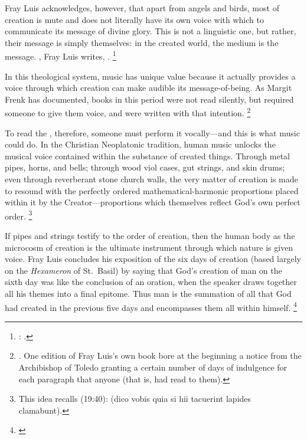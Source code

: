 Fray Luis acknowledges, however, that apart from angels and birds, most of creation is mute and does not literally have its own voice with which to communicate its message of divine glory.
This  is not a linguistic one, but rather, their message is simply themselves: in the created world, the medium is the message.
, Fray Luis writes, .%
	\footnote{%
	\Autocite[192]{LuisdeGranada:Simbolo}: .
	}

In this theological system, music has unique value because it actually provides a voice through which creation can make audible its message-of-being.
As Margit Frenk has documented, books in this period were not read silently, but required someone to give them voice, and were written with that intention.%
	\footnote{%
	\autocite{Frenk:Voz}.
One edition of Fray Luis's own book  bore at the beginning a notice from the Archibishop of Toledo granting a certain number of days of indulgence for each paragraph that anyone  (that is, had read to them).
	}

To read the , therefore, someone must perform it vocally---and this is what music could do.
In the Christian Neoplatonic tradition, human music unlocks the musical voice contained within the substance of created things.
Through metal pipes, horns, and bells; through wood viol cases, gut strings, and skin drums; even through reverberant stone church walls, the very matter of creation is made to resound with the perfectly ordered mathematical-harmonic proportions placed within it by the Creator---proportions which themselves reflect God's own perfect order.%
	\footnote{%
	This idea recalls (19:40):  (dico vobis quia si hii tacuerint lapides clamabunt).
	}

If pipes and strings testify to the order of creation, then the human body as the microcosm of creation is the ultimate instrument through which nature is given voice.
Fray Luis concludes his exposition of the six days of creation (based largely on the \emph{Hexameron} of St.~Basil) by saying that God's creation of man on the sixth day was like the conclusion of an oration, when the speaker draws together all his themes into a final epitome.
Thus man is the summation of all that God had created in the previous five days and encompasses them all within himself.%
	\footnote{%
	\Autocite[243]{LuisdeGranada:Simbolo}
	}

